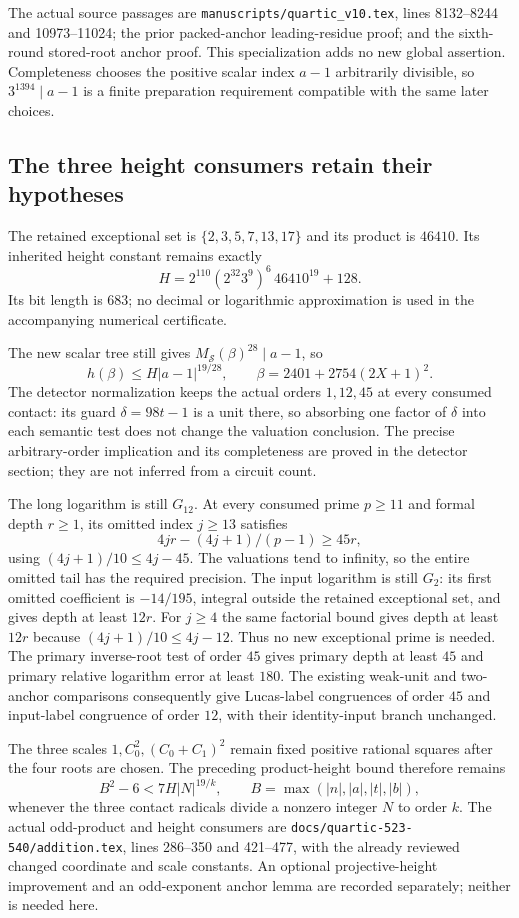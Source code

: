 The actual source passages are
\texttt{manuscripts/quartic\_v10.tex}, lines 8132--8244 and
10973--11024; the prior packed-anchor leading-residue proof; and the
sixth-round stored-root anchor proof.  This specialization adds no
new global assertion.  Completeness chooses the positive scalar index
$a-1$ arbitrarily divisible, so $3^{1394}\mid a-1$ is a finite
preparation requirement compatible with the same later choices.

\subsection{The three height consumers retain their hypotheses}

The retained exceptional set is $\{2,3,5,7,13,17\}$ and its product is
$46410$.  Its inherited height constant remains exactly
\[
 H=2^{110}(2^{32}3^9)^6\,46410^{19}+128.
\]
Its bit length is $683$; no decimal or logarithmic approximation is used
in the accompanying numerical certificate.

The new scalar tree still gives
$M_{\mathcal S}(\beta)^{28}\mid a-1$, so
\[
 h(\beta)\le H|a-1|^{19/28},\qquad
 \beta=2401+2754(2X+1)^2.
\]
The detector normalization keeps the actual orders $1,12,45$ at every
consumed contact: its guard $\delta=98t-1$ is a unit there, so absorbing
one factor of $\delta$ into each semantic test does not change the
valuation conclusion.  The precise arbitrary-order implication and
its completeness are proved in the detector section; they are not
inferred from a circuit count.

The long logarithm is still $G_{12}$.  At every consumed prime $p\ge11$
and formal depth $r\ge1$, its omitted index $j\ge13$ satisfies
\[
 4jr-(4j+1)/(p-1)\ge45r,
\]
using $(4j+1)/10\le4j-45$.  The valuations tend to infinity, so the
entire omitted tail has the required precision.  The input logarithm
is still $G_2$: its first omitted coefficient is $-14/195$, integral
outside the retained exceptional set, and gives depth at least $12r$.
For $j\ge4$ the same factorial bound gives depth at least $12r$ because
$(4j+1)/10\le4j-12$.  Thus no new exceptional prime is needed.
The primary inverse-root test of order $45$ gives primary depth at least
$45$ and primary relative logarithm error at least $180$.
The existing weak-unit and two-anchor comparisons consequently give
Lucas-label congruences of order $45$ and input-label congruence of
order $12$, with their identity-input branch unchanged.

The three scales $1,C_0^2,(C_0+C_1)^2$ remain fixed positive rational
squares after the four roots are chosen.  The preceding product-height
bound therefore remains
\[
 B^2-6<7H|N|^{19/k},\qquad B=\max(|n|,|a|,|t|,|b|),
\]
whenever the three contact radicals divide a nonzero integer $N$ to
order $k$.  The actual odd-product and height consumers are
\texttt{docs/quartic-523-540/addition.tex}, lines 286--350 and 421--477,
with the already reviewed changed coordinate and scale constants.
An optional projective-height improvement and an odd-exponent anchor
lemma are recorded separately; neither is needed here.


